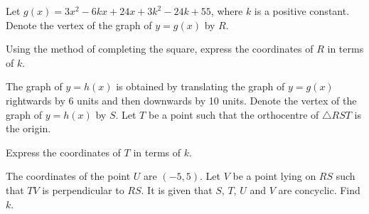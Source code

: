 
Let $g(x) = 3x^2 - 6kx + 24x + 3k^2 - 24k + 55$, where $k$ is a positive constant. Denote the vertex of the graph of $y=g(x)$ by $R$.


\begin{enumx}[label=(\alph*)]
   \item Using the method of completing the square, express the coordinates of $R$ in terms of $k$.
    \item The graph of $y=h(x)$ is obtained by translating the graph of $y=g(x)$ rightwards by 6 units and then downwards by 10 units. Denote the vertex of the graph of $y=h(x)$ by $S$. Let $T$ be a point such that the orthocentre of $\triangle RST$ is the origin.
    \begin{enumx}[label=(\roman*)]
        \item Express the coordinates of $T$ in terms of $k$.
        \item The coordinates of the point $U$ are $(-5,5)$. Let $V$ be a point lying on $RS$ such that $TV$ is perpendicular to $RS$. It is given that $S$, $T$, $U$ and $V$ are concyclic. Find $k$.
    \end{enumx}
\end{enumx}




